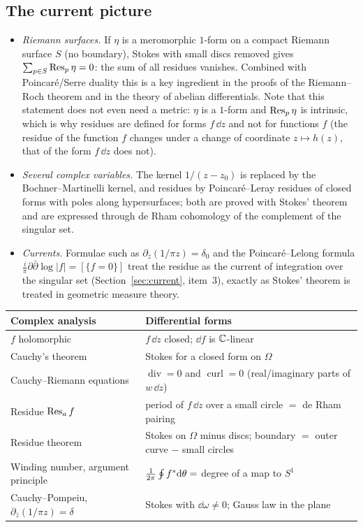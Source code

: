 \subsection{The current picture}\label{sec:rescurrent}

\begin{itemize}
\item \emph{Riemann surfaces.} If $\eta$ is a meromorphic $1$-form on a compact Riemann surface $S$ (no boundary), Stokes with small discs removed gives $\sum_{p\in S}\operatorname{Res}_p\eta=0$: the sum of all residues vanishes. Combined with Poincar\'e/Serre duality this is a key ingredient in the proofs of the Riemann--Roch theorem and in the theory of abelian differentials. Note that this statement does not even need a metric: $\eta$ is a $1$-form and $\operatorname{Res}_p\eta$ is intrinsic, which is why residues are defined for forms $f\,\dd z$ and not for functions $f$ (the residue of the function $f$ changes under a change of coordinate $z\mapsto h(z)$, that of the form $f\,\dd z$ does not).
\item \emph{Several complex variables.} The kernel $1/(z-z_0)$ is replaced by the Bochner--Martinelli kernel, and residues by Poincar\'e--Leray residues of closed forms with poles along hypersurfaces; both are proved with Stokes' theorem and are expressed through de Rham cohomology of the complement of the singular set.
\item \emph{Currents.} Formulae such as $\partial_{\bar z}(1/\pi z)=\delta_0$ and the Poincar\'e--Lelong formula $\frac i\pi\partial\bar\partial\log|f|=[\{f=0\}]$ treat the residue as the current of integration over the singular set (Section~\ref{sec:current}, item~3), exactly as Stokes' theorem is treated in geometric measure theory.
\end{itemize}

\begin{center}
\small
\renewcommand{\arraystretch}{1.3}
\begin{tabular}{@{}p{4.6cm}p{9.6cm}@{}}
\toprule
\textbf{Complex analysis} & \textbf{Differential forms}\\
\midrule
$f$ holomorphic & $f\,\dd z$ closed; $\dd f$ is $\mathbb{C}$-linear\\
Cauchy's theorem & Stokes for a closed form on $\Omega$\\
Cauchy--Riemann equations & $\operatorname{div}=0$ and $\operatorname{curl}=0$ (real/imaginary parts of $w\,\dd z$)\\
Residue $\operatorname{Res}_af$ & period of $f\,\dd z$ over a small circle $=$ de Rham pairing\\
Residue theorem & Stokes on $\Omega$ minus discs; boundary $=$ outer curve $-$ small circles\\
Winding number, argument principle & $\frac1{2\pi}\oint f{}^{*}\mathrm{d}\theta=$ degree of a map to $S^1$\\
Cauchy--Pompeiu, $\partial_{\bar z}(1/\pi z)=\delta$ & Stokes with $\dd\omega\neq0$; Gauss law in the plane\\
\bottomrule
\end{tabular}
\end{center}
